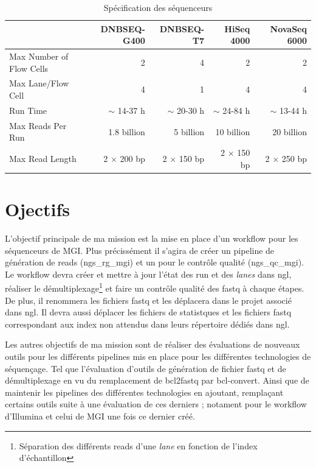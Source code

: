\begin{table}[H]
\begin{tabular}{ |p{5cm}||r|r|r|r| }
    \hline
    & \footnotesize{DNBSEQ-G400} & \footnotesize{DNBSEQ-T7} & \footnotesize{HiSeq 4000} & \footnotesize{NovaSeq 6000} \\\hline\hline
    Max Number of Flow Cells & 2 & 4 & 2 & 2 \\\hline
    Max Lane/Flow Cell & 4 & 1 & 4 & 4 \\\hline
    Run Time & $\sim$ 14-37 h & $\sim$ 20-30 h & $\sim$ 24-84 h & $\sim$ 13-44 h \\\hline
    Max Reads Per Run & 1.8 billion & 5 billion & 10 billion & 20 billion \\\hline
    Max Read Length & 2 $\times$ 200 bp & 2 $\times$ 150 bp & 2 $\times$ 150 bp & 2 $\times$ 250 bp \\\hline
\end{tabular}
    \caption{Spécification des séquenceurs}
    \label{spe-seq}
\end{table}

\section{Ojectifs}
L'objectif principale de ma mission est la mise en place d'un workflow pour les séquenceurs de MGI. Plus précissément il s'agira de créer un pipeline de génération de reads (ngs\_rg\_mgi) et un pour le contrôle qualité (ngs\_qc\_mgi). Le workflow devra créer et mettre à jour l'état des run et des \emph{lanes} dans ngl, réaliser le démultiplexage\footnote{Séparation des différents reads d'une \emph{lane} en fonction de l'index d'échantillon} et faire un contrôle qualité des fastq à chaque étapes. De plus, il renommera les fichiers fastq et les déplacera dans le projet associé dans ngl. Il devra aussi déplacer les fichiers de statistques et les fichiers fastq correspondant aux index non attendus dans leurs répertoire dédiés dans ngl.

Les autres objectifs de ma mission sont de réaliser des évaluations de nouveaux outils pour les différents pipelines mis en place pour les différentes technologies de séquençage. Tel que l'évaluation d'outils de génération de fichier fastq et de démultiplexage en vu du remplacement de bcl2fastq par bcl-convert.
Ainsi que de maintenir les pipelines des différentes technologies en ajoutant, remplaçant certains outils suite à une évaluation de ces derniers ; notament pour le workflow d'Illumina et celui de MGI une fois ce dernier créé.



